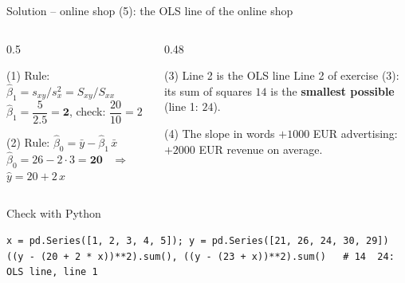 \documentclass[aspectratio=169,11pt]{beamer}
\begin{document}
\begin{frame}[fragile]{Solution -- online shop (5): the OLS line of the online shop}
  \lstset{aboveskip=2pt,belowskip=2pt}
  \vspace{-8pt}
  \begin{columns}[T]
    \begin{column}{0.5\textwidth}
      \begin{block}{(1) Rule: $\hat{\beta}_1 = s_{xy}/s_x^{2} = S_{xy}/S_{xx}$}
        $\hat{\beta}_1 = \dfrac{5}{2.5} = \mathbf{2}$, \qquad
        check: $\dfrac{20}{10} = 2$ \checkmark
      \end{block}
      \begin{block}{(2) Rule: $\hat{\beta}_0 = \bar{y} - \hat{\beta}_1\,\bar{x}$}
        $\hat{\beta}_0 = 26 - 2 \cdot 3 = \mathbf{20}$
        \ $\Rightarrow$ \ $\hat{y} = 20 + 2\,x$
      \end{block}
    \end{column}
    \begin{column}{0.48\textwidth}
      \small
      \begin{exampleblock}{(3) Line 2 is the OLS line}
        Line 2 of exercise (3): its sum of squares $14$ is the
        \textbf{smallest possible} (line 1: $24$).
      \end{exampleblock}
      \begin{exampleblock}{(4) The slope in words}
        $+1000$ EUR advertising: $+2000$ EUR revenue on average.
      \end{exampleblock}
    \end{column}
  \end{columns}
  \begin{exampleblock}{Check with Python}
\begin{lstlisting}
x = pd.Series([1, 2, 3, 4, 5]); y = pd.Series([21, 26, 24, 30, 29])
((y - (20 + 2 * x))**2).sum(), ((y - (23 + x))**2).sum()   # 14  24: OLS line, line 1
\end{lstlisting}
  \end{exampleblock}
\end{frame}
\end{document}

